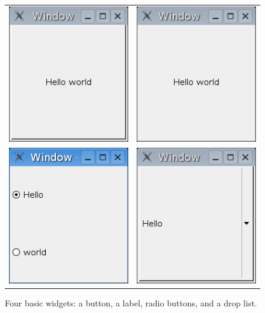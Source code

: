 \documentclass[12pt]{article}
\begin{document}
\begin{figure}[htbp]
  \centering
  \begin{tabular}{l@{\quad}l}
  \includegraphics[width=.35\textwidth]{button}&
  \includegraphics[width=.35\textwidth]{label}\\
  \includegraphics[width=.35\textwidth]{radio}&
  \includegraphics[width=.35\textwidth]{droplist}
  \end{tabular}
  \caption{Four basic widgets: a button, a label, radio buttons, and a drop list.}
  \label{fig:basic-widgets}
\end{figure}
\end{document}
